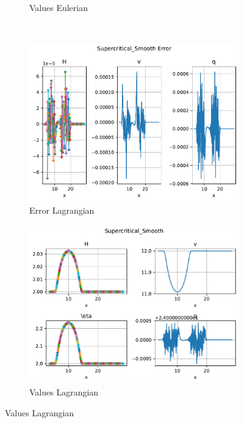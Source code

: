 \documentclass[pt12]{beamer}
\begin{document}
\begin{frame}
\begin{figure}
\begin{subfigure}[b]{0.39\textwidth}
         \caption{Values Eulerian}
     \end{subfigure}\\
     \begin{subfigure}[b]{0.39\textwidth}
         \centering
         \includegraphics[width=\textwidth]{figures/debug/sup/error_lagr.pdf}
         \caption{Error Lagrangian}
     \end{subfigure}
     \begin{subfigure}[b]{0.39\textwidth}
         \centering
         \includegraphics[width=\textwidth]{figures/debug/sup/values_lagr.pdf}
         \caption{Values Lagrangian}
     \end{subfigure}
\end{figure}



\end{frame}
\end{document}
